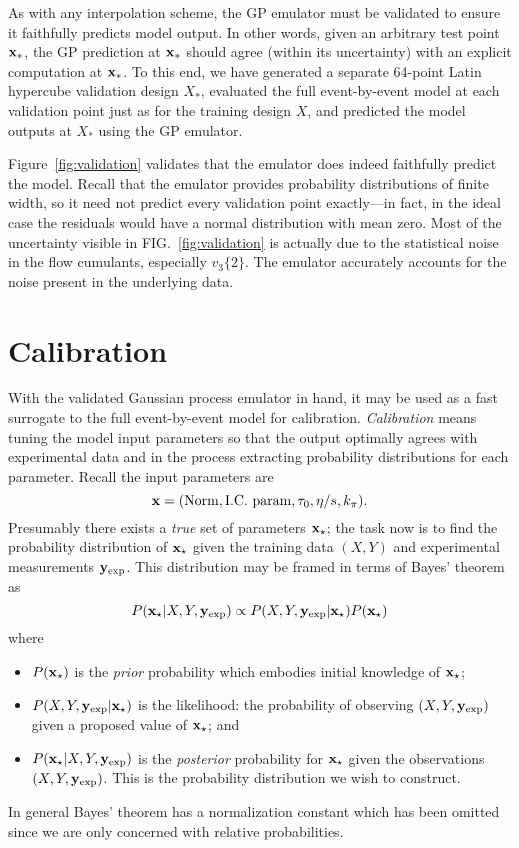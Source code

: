 \documentclass[aps,prc,reprint,superscriptaddress,amsmath]{revtex4-1}
\newcommand{\vnk}[2]{v_#1\{#2\}}
\begin{document}
As with any interpolation scheme, the GP emulator must be validated to ensure it faithfully predicts model output.
In other words, given an arbitrary test point $\mathbf x_*$, the GP prediction at $\mathbf x_*$ should agree (within its uncertainty) with an explicit computation at $\mathbf x_*$.
To this end, we have generated a separate 64-point Latin hypercube validation design $X_*$, evaluated the full event-by-event model at each validation point just as for the training design $X$, and predicted the model outputs at $X_*$ using the GP emulator.

Figure~\ref{fig:validation} validates that the emulator does indeed faithfully predict the model.
Recall that the emulator provides probability distributions of finite width, so it need not predict every validation point exactly---in fact, in the ideal case the residuals would have a normal distribution with mean zero.
Most of the uncertainty visible in FIG.~\ref{fig:validation} is actually due to the statistical noise in the flow cumulants, especially $\vnk 3 2$.
The emulator accurately accounts for the noise present in the underlying data.


\section{Calibration}

\newcommand{\z}{\mathbf z}
\newcommand{\xs}{\x_\star}
\newcommand{\zs}{\z_\star}
\newcommand{\yexp}{\y_\text{exp}}
\newcommand{\zexp}{\z_\text{exp}}

With the validated Gaussian process emulator in hand, it may be used as a fast surrogate to the full event-by-event model for calibration.
\emph{Calibration} means tuning the model input parameters so that the output optimally agrees with experimental data and in the process extracting probability distributions for each parameter.
Recall the input parameters are
\begin{equation*}
  \mathbf x = (\text{Norm}, \text{I.C.\ param}, \tau_0, \eta/s, k_\pi).
\end{equation*}
Presumably there exists a \emph{true} set of parameters $\xs$; the task now is to find the probability distribution of $\xs$ given the training data $(X, Y)$ and experimental measurements $\yexp$.
This distribution may be framed in terms of Bayes' theorem as
\begin{equation}
  P(\xs|X,Y,\yexp) \propto P(X,Y,\yexp|\xs) P(\xs)
\end{equation}
where
\begin{itemize}
  \item $P(\xs)$ is the \emph{prior} probability which embodies initial knowledge of $\xs$;
  \item $P(X,Y,\yexp|\xs)$ is the likelihood:
    the probability of observing $(X, Y, \yexp)$ given a proposed value of $\xs$; and
  \item $P(\xs|X,Y,\yexp)$ is the \emph{posterior} probability for $\xs$ given the observations $(X, Y, \yexp)$.
    This is the probability distribution we wish to construct.
\end{itemize}
In general Bayes' theorem has a normalization constant which has been omitted since we are only concerned with relative probabilities.
\end{document}
